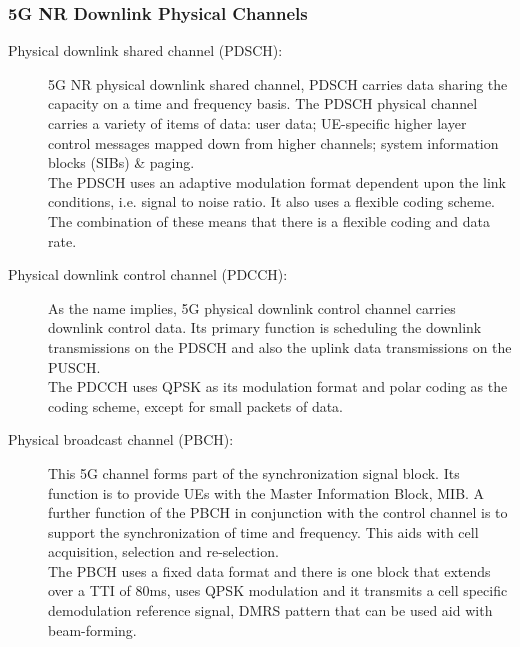 \subsubsection{5G NR Downlink Physical Channels}
\begin{description}
    \item[Physical downlink shared channel (PDSCH):] 5G NR physical downlink shared channel, PDSCH carries data sharing the capacity on a time and frequency basis. The PDSCH physical channel carries a variety of items of data: user data; UE-specific higher layer control messages mapped down from higher channels; system information blocks (SIBs) \& paging. \\
    The PDSCH uses an adaptive modulation format dependent upon the link conditions, i.e. signal to noise ratio. It also uses a flexible coding scheme. The combination of these means that there is a flexible coding and data rate.
    \item[Physical downlink control channel (PDCCH):] As the name implies, 5G physical downlink control channel carries downlink control data. Its primary function is scheduling the downlink transmissions on the PDSCH and also the uplink data transmissions on the PUSCH.\\
    The PDCCH uses QPSK as its modulation format and polar coding as the coding scheme, except for small packets of data.
    \item[Physical broadcast channel (PBCH):] This 5G channel forms part of the synchronization signal block. Its function is to provide UEs with the Master Information Block, MIB. A further function of the PBCH in conjunction with the control channel is to support the synchronization of time and frequency. This aids with cell acquisition, selection and re-selection.\\
    The PBCH uses a fixed data format and there is one block that extends over a TTI of 80ms, uses QPSK modulation and it transmits a cell specific demodulation reference signal, DMRS pattern that can be used aid with beam-forming.
\end{description}

